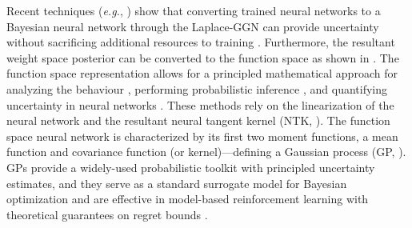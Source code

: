 \documentclass{article}
\makeatletter
\newcommand{\eg}{\textit{e.g.\@}\xspace}
\makeatother
\begin{document}
Recent techniques (\eg, \cite{ritter2018kfac,khan2019approximate,daxberger2021laplace,fortuin2021bayesian,immer2021scalable}) show that converting trained neural networks to a Bayesian neural network through the Laplace-GGN  can provide uncertainty without sacrificing additional resources to training \cite{foong2019between}. Furthermore, the resultant weight space posterior can be converted to the function space as shown in \cite{khan2019approximate, immer2021improving}. The function space representation allows for a principled mathematical approach for analyzing the behaviour \cite{cho2009kernel,meronen2020stationary}, performing probabilistic inference \cite{khan2019approximate}, and quantifying uncertainty in neural networks \cite{foong2019between}. These methods rely on the linearization of the neural network and the resultant neural tangent kernel (NTK, \cite{jacot2018neural}). The function space neural network is characterized by its first two moment functions, a mean function and covariance function (or kernel)---defining a Gaussian process (GP, \cite{rasmussen2006gaussian}). GPs provide a widely-used probabilistic toolkit with principled uncertainty estimates, and they serve as a standard surrogate model for Bayesian optimization \citep{garnett_bayesoptbook_2022} and are effective in model-based reinforcement learning \citep{deisenroth2011pilco} with theoretical guarantees on regret bounds \citep{srinivas2009gaussian}. 
\end{document}
